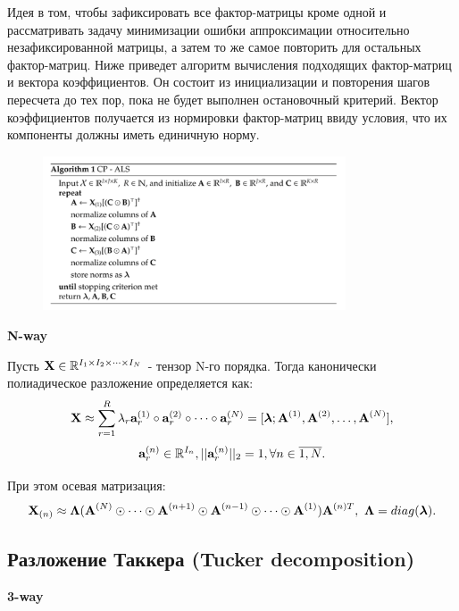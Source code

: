 Идея в том, чтобы зафиксировать все фактор-матрицы кроме одной и рассматривать задачу минимизации ошибки аппроксимации относительно незафиксированной матрицы, а затем то же самое повторить для остальных фактор-матриц. Ниже приведет алгоритм вычисления подходящих фактор-матриц и вектора коэффициентов. Он состоит из инициализации и повторения шагов пересчета до тех пор, пока не будет выполнен остановочный критерий. Вектор коэффициентов получается из нормировки фактор-матриц ввиду условия, что их компоненты должны иметь единичную норму.

\begin{figure}[h]
	\centering
	\includegraphics[width=0.8\textwidth]{chapters/varenik2/images/cp-als.png}
\end{figure}

\textbf{N-way}

Пусть $\textbf{X} \in \mathbb{R}^{I_1\times I_2 \times \dots \times I_N}$ - тензор N-го порядка. Тогда канонически полиадическое разложение определяется как:
\begin{gather}
    \textbf{X} \approx \sum\limits_{r=1}^R \lambda_r \textbf{a}_r^{(1)} \circ \textbf{a}_r^{(2)} \circ \dots \circ \textbf{a}_r^{(N)} = [\bm{\lambda}; \textbf{A}^{(1)}, \textbf{A}^{(2)}, \dots, \textbf{A}^{(N)}],
\end{gather}
$$\textbf{a}_r^{(n)} \in \mathbb{R}^{I_n}, ||\textbf{a}_r^{(n)}||_2 = 1, \forall n \in \overline{1, N}.$$
        
При этом осевая матризация:
\begin{gather*}
    \textbf{X}_{(n)} \approx \bm{\Lambda} (\textbf{A}^{(N)} \odot \dots \odot \textbf{A}^{(n+1)} \odot \textbf{A}^{(n-1)} \odot \dots \odot \textbf{A}^{(1)})\textbf{A}^{(n)T}, \text{ } \bm{\Lambda} = diag(\bm{\lambda}).
\end{gather*}

\subsection{Разложение Таккера (Tucker decomposition)}
\textbf{3-way}

